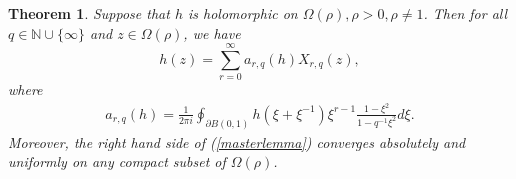 \documentclass[10pt,a4paper]{amsart}
\newtheorem{theorem}{Theorem}
\begin{document}
\begin{theorem}\label{master}
    Suppose that $h$ is holomorphic on $\Omega(\rho), \rho>0, \rho\neq 1$.
    Then for all $q\in \mathbb{N}\cup \{\infty\}$ and $z \in \Omega(\rho)$, we have
    \begin{equation}\label{masterlemma}
        h(z)=\sum_{r=0}^{\infty}a_{r,q}(h)X_{r,q}(z),
    \end{equation}
    where
    \begin{equation}\label{crq}
    \begin{aligned}
        a_{r,q}(h)=\frac{1}{2\pi i}\oint_{\partial B(0,1)} h(\xi+\xi^{-1})\xi^{r-1}\frac{1-\xi^2}{1-q^{-1}\xi^2}d\xi.
    \end{aligned}
    \end{equation}
    Moreover, the right hand side of (\ref{masterlemma}) converges absolutely and uniformly on any compact subset of $\Omega(\rho)$.
\end{theorem}
\end{document}
